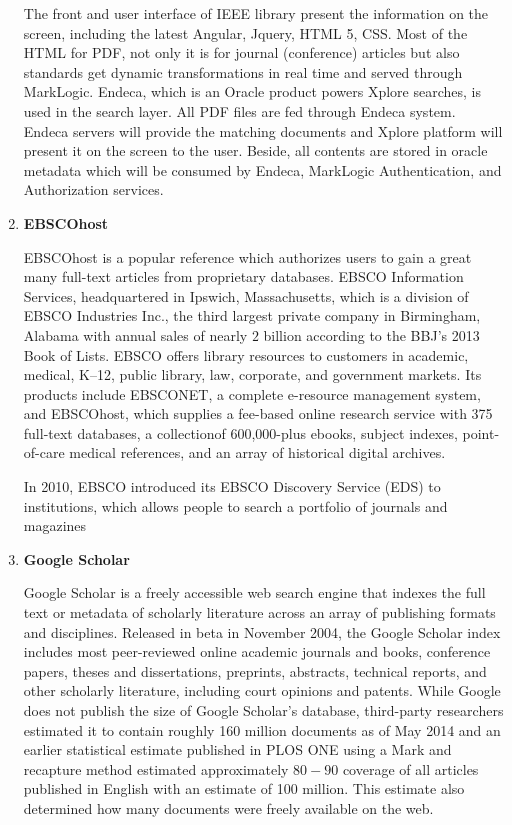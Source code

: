 \begin{enumerate}
	The front and user interface of IEEE library present the information on the screen, including the latest Angular, Jquery, HTML 5, CSS.
	Most of the HTML for PDF, not only it is for journal (conference) articles but also standards get dynamic transformations in real time and served through MarkLogic.
	Endeca, which is an Oracle product powers Xplore searches, is used in the search layer.
	All PDF files are fed through Endeca system.
	Endeca servers will provide the matching documents and Xplore platform will present it on the screen to the user.
	Beside, all contents are stored in oracle metadata which will be consumed by Endeca, MarkLogic Authentication, and Authorization services.
	
	\item\textbf{EBSCOhost}
	\setlength{\parindent}{1em}

	EBSCOhost is a popular reference which authorizes users to gain a great many full-text articles from proprietary databases.
	EBSCO Information Services, headquartered in Ipswich, Massachusetts, which is a division of EBSCO Industries Inc., the third largest private company in Birmingham, Alabama with annual sales of nearly $2$ billion according to the BBJ's 2013 Book of Lists.
    EBSCO offers library resources to customers in academic, medical, K–12, public library, law, corporate, and government markets. 
	Its products include EBSCONET, a complete e-resource management system, and EBSCOhost, which supplies a fee-based online research service with 375 full-text databases, a collectionof 600,000-plus ebooks, subject indexes, point-of-care medical references, and an array of historical digital archives.

    In 2010, EBSCO introduced its EBSCO Discovery Service (EDS) to institutions, which allows people to search a portfolio of journals and magazines

	\item\textbf{Google Scholar}
	\setlength{\parindent}{1em}
	
	Google Scholar is a freely accessible web search engine that indexes the full text or metadata of scholarly literature across an array of publishing formats and disciplines. Released in beta in November 2004, the Google Scholar index includes most peer-reviewed online academic journals and books, conference papers, theses and dissertations, preprints, abstracts, technical reports, and other scholarly literature, including court opinions and patents. While Google does not publish the size of Google Scholar's database, third-party researchers estimated it to contain roughly 160 million documents as of May 2014 and an earlier statistical estimate published in PLOS ONE using a Mark and recapture method estimated approximately $80-90$ coverage of all articles published in English with an estimate of 100 million. This estimate also determined how many documents were freely available on the web.
	

\end{enumerate}
